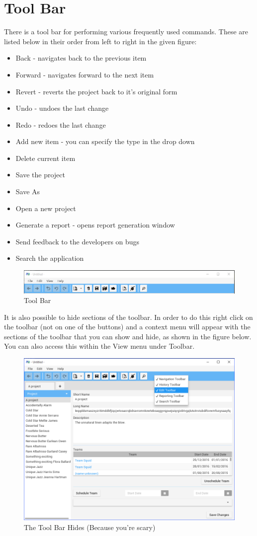 \section{Tool Bar}

There is a tool bar for performing various frequently used commands. These are listed below in their order from left to right in the given figure:

\begin{itemize}
\item Back - navigates back to the previous item
\item Forward - navigates forward to the next item
\item Revert - reverts the project back to it's original form
\item Undo - undoes the last change
\item Redo - redoes the last change
\item Add new item - you can specify the type in the drop down
\item Delete current item
\item Save the project
\item Save As
\item Open a new project
\item Generate a report - opens report generation window
\item Send feedback to the developers on bugs
\item Search the application
\end{itemize}

\begin{figure}[H]
\centering
\includegraphics[width=\textwidth]{images/screenshots/toolbar.PNG}
\caption{Tool Bar}
\label{fig:new_project}
\end{figure}

It is also possible to hide sections of the toolbar. In order to do this right click on the toolbar (not on one of the buttons) and a context menu will appear with the sections of the toolbar that you can show and hide, as shown in the figure below. You can also access this within the View menu under Toolbar.

\begin{figure}[H]
\centering
\includegraphics[width=\textwidth]{images/screenshots/toolbar1.PNG}
\caption{The Tool Bar Hides (Because you're scary)}
\label{fig:new_project}
\end{figure}